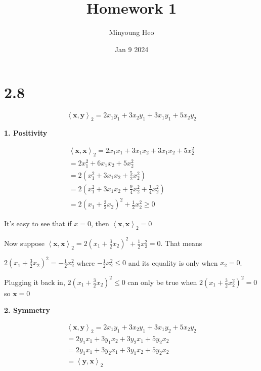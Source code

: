 \documentclass[
  12pt,
]{article}
\title{Homework 1}
\author{Minyoung Heo}
\date{Jan 9 2024}
\begin{document}
\maketitle

\chapter{2.8}\label{section}

\newcommand{\boldx}{\mathbf{x}}
\newcommand{\boldy}{\mathbf{y}}
\newcommand{\boldz}{\mathbf{z}}
\newcommand{\innerprod}[2]{\left<#1, #2\right>}

\[
\left<\mathbf{x}, \mathbf{y}\right>_2 = 2x_1 y_1 + 3x_2 y_1 + 3x_1 y_1 + 5x_2 y_2
\]

\textbf{1. Positivity}

\[
\begin{aligned}
\left<\mathbf{x}, \mathbf{x}\right>_2 = 2x_1 x_1 + 3x_1 x_2 + 3x_1 x_2 + 5x_2^2 \\
= 2x_1^2 + 6x_1 x_2 + 5x_2^2 \\
= 2(x_1^2 + 3x_1 x_2 + \frac{5}{2} x_2^2) \\
= 2(x_1^2 + 3x_1 x_2 + \frac{9}{4} x_2^2 + \frac{1}{4}x_2^2) \\
= 2(x_1 + \frac{3}{2}x_2)^2 + \frac{1}{2}x_2^2 \geq 0
\end{aligned} 
\]

It's easy to see that if \(x=0\), then \(\left<\mathbf{x}, \mathbf{x}\right>_2 = 0\)

Now suppose \(\left<\mathbf{x}, \mathbf{x}\right>_2 = 2(x_1 + \frac{3}{2}x_2)^2 + \frac{1}{2}x_2^2= 0\). That means

\(2(x_1 + \frac{3}{2}x_2)^2 = -\frac{1}{2}x_2^2\) where \(-\frac{1}{2}x_2^2 \leq 0\) and its equality is only when \(x_2 = 0\).

Plugging it back in, \(2(x_1 + \frac{3}{2}x_2)^2 \leq 0\) can only be true when \(2(x_1 + \frac{3}{2}x_2^2)^2 = 0\) so \(\mathbf{x}= 0\)

\textbf{2. Symmetry}

\[
\begin{aligned}
\left<\mathbf{x}, \mathbf{y}\right>_2 = 2x_1 y_1 + 3x_2 y_1 + 3x_1 y_2 + 5x_2 y_2 \\
= 2y_1 x_1 + 3y_1 x_2 + 3y_2 x_1 + 5y_2 x_2 \\
= 2y_1 x_1 + 3y_2 x_1 + 3y_1 x_2 + 5y_2 x_2 \\
= \left<\mathbf{y}, \mathbf{x}\right>_2
\end{aligned}
\]
\end{document}
